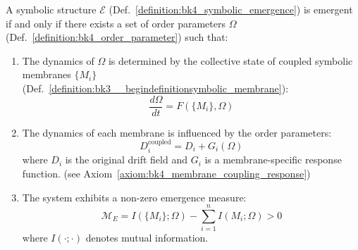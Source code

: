 \begin{theorem}
\label{theorem:bk4_emergence_criterion}
A symbolic structure $\mathcal{E}$ (Def.~\ref{definition:bk4_symbolic_emergence}) is emergent if and only if there exists a set of order parameters $\Omega$ (Def.~\ref{definition:bk4_order_parameter}) such that:
\begin{enumerate}
    \item The dynamics of $\Omega$ is determined by the collective state of coupled symbolic membranes $\{M_i\}$ (Def.~\ref{definition:bk3__begindefinitionsymbolic_membrane}):
    \begin{equation}
        \frac{d\Omega}{dt} = F(\{M_i\}, \Omega)
    \end{equation}
    \item The dynamics of each membrane is influenced by the order parameters:
    \begin{equation}
        D_i^{\text{coupled}} = D_i + G_i(\Omega)
    \end{equation}
    where $D_i$ is the original drift field and $G_i$ is a membrane-specific response function.  (see Axiom~\ref{axiom:bk4_membrane_coupling_response})
    \item The system exhibits a non-zero emergence measure:
    \begin{equation}
        \mathcal{M}_E = I(\{M_i\}; \Omega) - \sum_{i=1}^{n} I(M_i; \Omega) > 0
    \end{equation}
    where $I(\cdot;\cdot)$ denotes mutual information.
\end{enumerate}
\end{theorem}

